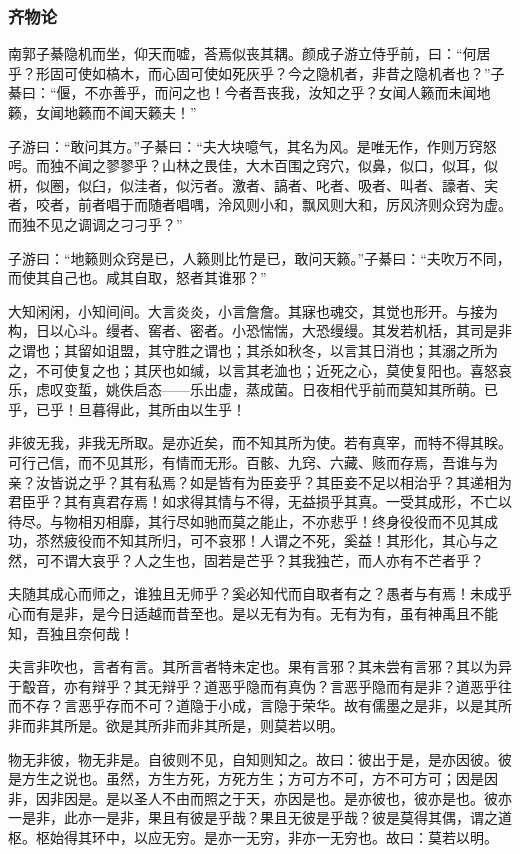 \documentclass[]{article}
\begin{document}
\hypertarget{header-n28}{%
\subsubsection{齐物论}\label{header-n28}}

南郭子綦隐机而坐，仰天而嘘，荅焉似丧其耦。颜成子游立侍乎前，曰：``何居乎？形固可使如槁木，而心固可使如死灰乎？今之隐机者，非昔之隐机者也？''子綦曰：``偃，不亦善乎，而问之也！今者吾丧我，汝知之乎？女闻人籁而未闻地籁，女闻地籁而不闻天籁夫！''

子游曰：``敢问其方。''子綦曰：``夫大块噫气，其名为风。是唯无作，作则万窍怒呺。而独不闻之翏翏乎？山林之畏佳，大木百围之窍穴，似鼻，似口，似耳，似枅，似圈，似臼，似洼者，似污者。激者、謞者、叱者、吸者、叫者、譹者、宎者，咬者，前者唱于而随者唱喁，泠风则小和，飘风则大和，厉风济则众窍为虚。而独不见之调调之刁刁乎？''

子游曰：``地籁则众窍是已，人籁则比竹是已，敢问天籁。''子綦曰：``夫吹万不同，而使其自己也。咸其自取，怒者其谁邪？''

大知闲闲，小知间间。大言炎炎，小言詹詹。其寐也魂交，其觉也形开。与接为构，日以心斗。缦者、窖者、密者。小恐惴惴，大恐缦缦。其发若机栝，其司是非之谓也；其留如诅盟，其守胜之谓也；其杀如秋冬，以言其日消也；其溺之所为之，不可使复之也；其厌也如缄，以言其老洫也；近死之心，莫使复阳也。喜怒哀乐，虑叹变蜇，姚佚启态------乐出虚，蒸成菌。日夜相代乎前而莫知其所萌。已乎，已乎！旦暮得此，其所由以生乎！

非彼无我，非我无所取。是亦近矣，而不知其所为使。若有真宰，而特不得其眹。可行己信，而不见其形，有情而无形。百骸、九窍、六藏、赅而存焉，吾谁与为亲？汝皆说之乎？其有私焉？如是皆有为臣妾乎？其臣妾不足以相治乎？其递相为君臣乎？其有真君存焉！如求得其情与不得，无益损乎其真。一受其成形，不亡以待尽。与物相刃相靡，其行尽如驰而莫之能止，不亦悲乎！终身役役而不见其成功，苶然疲役而不知其所归，可不哀邪！人谓之不死，奚益！其形化，其心与之然，可不谓大哀乎？人之生也，固若是芒乎？其我独芒，而人亦有不芒者乎？

夫随其成心而师之，谁独且无师乎？奚必知代而自取者有之？愚者与有焉！未成乎心而有是非，是今日适越而昔至也。是以无有为有。无有为有，虽有神禹且不能知，吾独且奈何哉！

夫言非吹也，言者有言。其所言者特未定也。果有言邪？其未尝有言邪？其以为异于鷇音，亦有辩乎？其无辩乎？道恶乎隐而有真伪？言恶乎隐而有是非？道恶乎往而不存？言恶乎存而不可？道隐于小成，言隐于荣华。故有儒墨之是非，以是其所非而非其所是。欲是其所非而非其所是，则莫若以明。

物无非彼，物无非是。自彼则不见，自知则知之。故曰：彼出于是，是亦因彼。彼是方生之说也。虽然，方生方死，方死方生；方可方不可，方不可方可；因是因非，因非因是。是以圣人不由而照之于天，亦因是也。是亦彼也，彼亦是也。彼亦一是非，此亦一是非，果且有彼是乎哉？果且无彼是乎哉？彼是莫得其偶，谓之道枢。枢始得其环中，以应无穷。是亦一无穷，非亦一无穷也。故曰：莫若以明。
\end{document}
